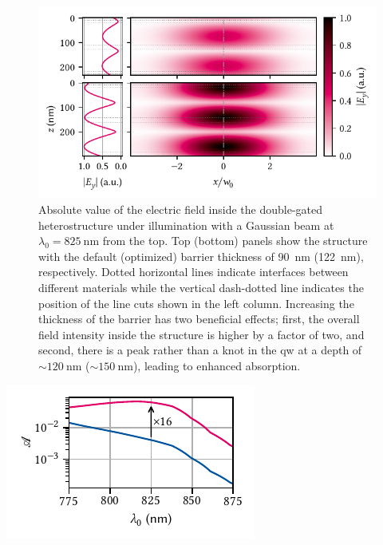 \begin{figure}
    \centering
    \includegraphics{img/pdf/experiment/tmm_field}
    \caption[]{
        Absolute value of the electric field inside the double-gated heterostructure under illumination with a Gaussian beam at $\lambda_0=\qty{825}{\nano\meter}$ from the top.
        Top (bottom) panels show the structure with the default (optimized) barrier thickness of \qty{90}{\nano\meter} (\qty{122}{\nano\meter}), respectively.
        Dotted horizontal lines indicate interfaces between different materials while the vertical dash-dotted line indicates the position of the line cuts shown in the left column.
        Increasing the thickness of the barrier has two beneficial effects; first, the overall field intensity inside the structure is higher by a factor of two, and second, there is a peak rather than a knot in the \gls{qw} at a depth of $\sim\qty{120}{\nano\meter}$ ($\sim\qty{150}{\nano\meter}$), leading to enhanced absorption.
    }
    \label{fig:exp:tmm:field}
\end{figure}

\begin{marginfigure}
    \centering
    \includegraphics{img/pdf/experiment/tmm_absorptance}
    \caption[]{
        \Gls{qw} absorptance \absorptance in a heterostructure with default (blue) and optimized (magenta) barrier thickness and top and bottom gates as function of wavelength.
        Optimization was performed at \qty{825}{\nano\meter} using the differential evolution algorithm implemented in \pymoosh, resulting in a barrier thickness of \qty{122}{\nano\meter} and an absorptance better by a factor of \num{16} at \qty{6.3}{\percent}.
    }
    \label{fig:exp:tmm:wavelengths}
\end{marginfigure}

